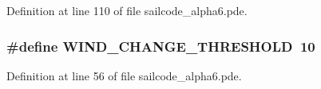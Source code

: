 \-Definition at line 110 of file sailcode\-\_\-alpha6.\-pde.

\hypertarget{group__globalconstants_ga0e751f6a929915f9b2ea482bc096d3ca}{
\subsubsection[{\-W\-I\-N\-D\-\_\-\-C\-H\-A\-N\-G\-E\-\_\-\-T\-H\-R\-E\-S\-H\-O\-L\-D}]{\setlength{\rightskip}{0pt plus 5cm}\#define \-W\-I\-N\-D\-\_\-\-C\-H\-A\-N\-G\-E\-\_\-\-T\-H\-R\-E\-S\-H\-O\-L\-D~10}}
\label{group__globalconstants_ga0e751f6a929915f9b2ea482bc096d3ca}


\-Definition at line 56 of file sailcode\-\_\-alpha6.\-pde.

